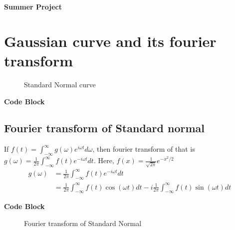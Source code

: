 \documentclass[11pt,a4paper]{article}
\author{Pritish Karmakar}
\begin{document}
	\begin{titlepage}
		\begin{center}
			\Huge \textbf{Summer Project}
			
		\end{center}
		\clearpage
		\tableofcontents
		\clearpage
		\listoffigures
		\listoftables
	\end{titlepage}
	
\section{Gaussian curve and its fourier transform}
	\begin{figure}[ht]
		\centering
		\scalebox{1.15}{}
		 \caption{Standard Normal curve}
		\label{fig:gaussian}
	\end{figure}


\noindent \dotfill \textbf{Code Block} \noindent\dotfill
%

\dotfill

\subsection{Fourier transform of Standard normal}
If $f(t)=\int_{-\infty}^{\infty}g(\omega)e^{i\omega t} d\omega$, then fourier transform of that is $g(\omega)=\frac{1}{2\pi}\int_{-\infty}^{\infty}f(t)e^{-i\omega t} dt$. Here, $f(x)=\frac{1}{\sqrt{2\pi}}e^{-x^2 /2}$\\

\begin{align*}
	g(\omega)&=\frac{1}{2\pi}\int_{-\infty}^{\infty}f(t)e^{-i\omega t} dt\\
	&=\frac{1}{2\pi}\int_{-\infty}^{\infty}f(t)\cos(\omega t) dt - i \frac{1}{2\pi}\int_{-\infty}^{\infty}f(t)\sin(\omega t) dt
\end{align*}

\noindent \dotfill \textbf{Code Block} \noindent\dotfill

\dotfill

\begin{figure}[ht]
	\centering
	\scalebox{1}{}
	\caption{Fourier transform of Standard Normal}
	\label{fig:fft_gaussian}
\end{figure}
\end{document}
